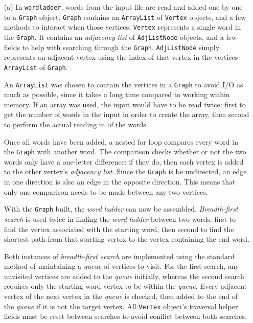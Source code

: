 \documentclass{article}
\begin{document}
\begin{itemize}
    \item[(a)]
    In \texttt{wordladder}, words from the input file are read and added one by one to a \texttt{Graph} object. \texttt{Graph} contains an \texttt{ArrayList} of \texttt{Vertex} objects, and a few methods to interact when those vertices. \texttt{Vertex} represents a single word in the \texttt{Graph}. It contains an \textit{adjacency list} of \texttt{AdjListNode} objects, and a few fields to help with searching through the \texttt{Graph}. \texttt{AdjListNode} simply represents an adjacent vertex using the index of that vertex in the vertices \texttt{ArrayList} of \texttt{Graph}.

    An \texttt{ArrayList} was chosen to contain the vertices in a \texttt{Graph} to avoid I/O as much as possible, since it takes a long time compared to working within memory. If an array was used, the input would have to be read twice: first to get the number of words in the input in order to create the array, then second to perform the actual reading in of the words.

    Once all words have been added, a nested for loop compares every word in the \texttt{Graph} with another word. The comparison checks whether or not the two words only have a one-letter difference: if they do, then each vertex is added to the other vertex's \textit{adjacency list}. Since the \texttt{Graph} is be undirected, an edge in one direction is also an edge in the opposite direction. This means that only one comparison needs to be made between any two vertices.

    With the \texttt{Graph} built, the \textit{word ladder} can now be assembled. \textit{Breadth-first search} is used twice in finding the \textit{word ladder} between two words: first to find the vertex associated with the starting word, then second to find the shortest path from that starting vertex to the vertex containing the end word.

    Both instances of \textit{breadth-first search} are implemented using the standard method of maintaining a \textit{queue} of vertices to visit. For the first search, any unvisited vertices are added to the \textit{queue} initially, whereas the second search requires only the starting word vertex to be within the \textit{queue}.
    Every adjacent vertex of the next vertex in the \textit{queue} is checked, then added to the end of the \textit{queue} if it is not the target vertex. All \texttt{Vertex} object's traversal helper fields must be reset between searches to avoid conflict between both searches.


\end{itemize}
\end{document}
